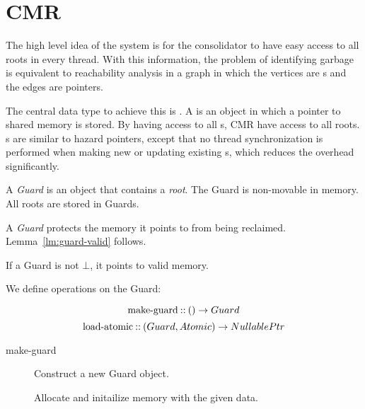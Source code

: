\chapter{CMR}

The high level idea of the system is for the consolidator to have easy access to all roots in every
thread. With this information, the problem of identifying garbage is equivalent to reachability
analysis in a graph in which the vertices are s and the edges are pointers.

The central data type to achieve this is . A  is an object in which a
pointer to shared memory is stored. By having access to all s, CMR have access to all
roots. s are similar to hazard pointers, except that no thread synchronization is
performed when making new or updating existing s, which reduces the overhead
significantly.

\vspace{2cm}

\begin{definition}[Guard]
  A \emph{Guard} is an object that contains a \emph{root}. The Guard is non-movable in memory.
  All roots are stored in Guards.
\end{definition}

A \emph{Guard} protects the memory it points to from being reclaimed. Lemma~\ref{lm:guard-valid}
follows.

\begin{lemma}\label{lm:guard-valid}
  If a Guard is not $\bot$, it points to valid memory.
\end{lemma}

We define operations on the Guard:


\begin{equation}\label{eq:make-guard}
  \text{make-guard\:::\:} () \to Guard
\end{equation}
\begin{equation}\label{eq:load-atomic}
  \text{load-atomic\:::\:} (Guard, Atomic) \to NullablePtr
\end{equation}

\begin{description}
  \item[make-guard] Construct a new Guard object.
  \item[] Allocate and initailize memory with the given data.
\end{description}
